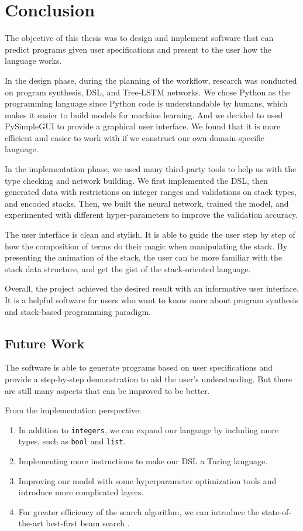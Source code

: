 \chapter{Conclusion}
The objective of this thesis was to design and implement software that can predict programs given user specifications and present to the user how the language works.

In the design phase, during the planning of the workflow, research was conducted on program synthesis, DSL, and Tree-LSTM networks. We chose Python as the programming language since Python code is understandable by humans, which makes it easier to build models for machine learning. And we decided to used PySimpleGUI to provide a graphical user interface. We found that it is more efficient and easier to work with if we construct our own domain-specific language.

In the implementation phase, we used many third-party tools to help us with the type checking and network building. We first implemented the DSL, then generated data with restrictions on integer ranges and validations on stack types, and encoded stacks. Then, we built the neural network, trained the model, and experimented with different hyper-parameters to improve the validation accuracy. 

The user interface is clean and stylish. It is able to guide the user step by step of how the composition of terms do their magic when manipulating the stack. By presenting the animation of the stack, the user can be more familiar with the stack data structure, and get the gist of the stack-oriented language.

Overall, the project achieved the desired result with an informative user interface. It is a helpful software for users who want to know more about program synthesis and stack-based programming paradigm.

\section*{Future Work}
The software is able to generate programs based on user specifications and provide a step-by-step demonstration to aid the user's understanding. But there are still many aspects that can be improved to be better. 

From the implementation perspective:
\begin{enumerate}
    \item In addition to \texttt{integers}, we can expand our language by including more types, such as \texttt{bool} and \texttt{list}.
    \item Implementing more instructions to make our DSL a Turing language.
    \item Improving our model with some hyperparameter optimization tools and introduce more complicated layers.
    \item For greater efficiency of the search algorithm, we can introduce the state-of-the-art best-first beam search \cite{best-first}.
\end{enumerate}

